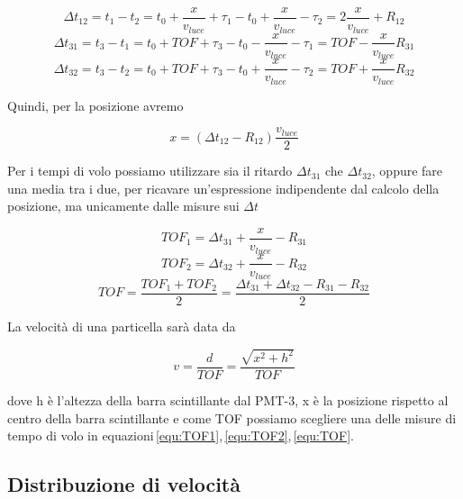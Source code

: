 \documentclass[a4paper,twocolumn]{article}
\begin{document}
\begin{equation}
\Delta t_{12} = t_1 - t_2 = t_0 + \frac{x}{v_{luce}} + \tau_1 - t_0 + \frac{x}{v_{luce}} - \tau_2 = 2\frac{x}{v_{luce}} + R_{12}
\end{equation}
\begin{equation}
\Delta t_{31} = t_3 - t_1 = t_0 + TOF + \tau_3 - t_0 - \frac{x}{v_{luce}} - \tau_1 = TOF - \frac{x}{v_{luce}} R_{31}
\end{equation}
\begin{equation}
\Delta t_{32} = t_3 - t_2 = t_0 + TOF + \tau_3 - t_0 + \frac{x}{v_{luce}} - \tau_2 = TOF + \frac{x}{v_{luce}} R_{32}
\end{equation}

Quindi, per la posizione avremo

\begin{equation}
x = (\Delta t_{12} - R_{12})\frac{v_{luce}}{2}
\label{equ:PosX}
\end{equation}

Per i tempi di volo possiamo utilizzare sia il ritardo $\Delta t_{31}$ che $\Delta t_{32}$, oppure fare una media tra i due, per ricavare un'espressione indipendente dal calcolo della posizione, ma unicamente dalle misure sui $\Delta t$

\begin{equation}
TOF_1 = \Delta t_{31} + \frac{x}{v_{luce}} - R_{31}
\label{equ:TOF1}
\end{equation}
\begin{equation}
TOF_2 = \Delta t_{32} + \frac{x}{v_{luce}} - R_{32}
\label{equ:TOF2}
\end{equation}
\begin{equation}
TOF = \frac{TOF_1 + TOF_2}{2} = \frac{\Delta t_{31} + \Delta t_{32} - R_{31} - R_{32}}{2}
\label{equ:TOF}
\end{equation}

La velocità di una particella sarà data da

\begin{equation}
v = \frac{d}{TOF} = \frac{\sqrt{x^2+h^2}}{TOF}
\label{equ:VMu}
\end{equation}

dove h è l'altezza della barra scintillante dal PMT-3, x è la posizione rispetto al centro della barra scintillante e come TOF possiamo scegliere una delle misure di tempo di volo in equazioni\,\ref{equ:TOF1},\,\ref{equ:TOF2},\,\ref{equ:TOF}.

\subsection{Distribuzione di velocità}
\label{sec:MisureV}
\end{document}
